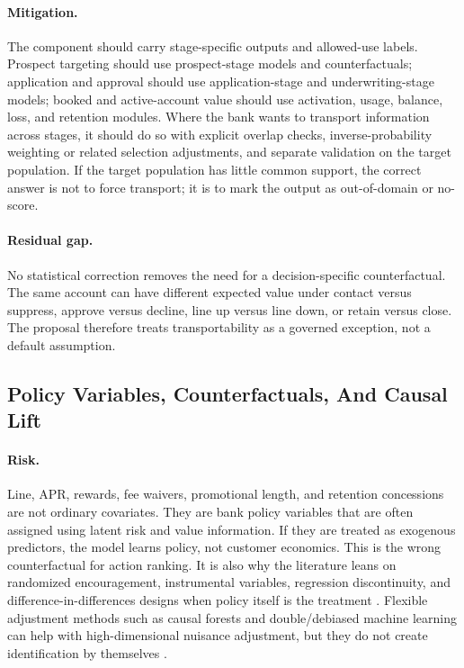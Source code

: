 \documentclass[11pt]{article}
\newcommand{\1}{\mathbf{1}}
\begin{document}
\paragraph{Mitigation.}
The component should carry stage-specific outputs and allowed-use labels.
Prospect targeting should use prospect-stage models and counterfactuals;
application and approval should use application-stage and underwriting-stage
models; booked and active-account value should use activation, usage, balance,
loss, and retention modules. Where the bank wants to transport information
across stages, it should do so with explicit overlap checks, inverse-probability
weighting or related selection adjustments, and separate validation on the
target population. If the target population has little common support, the
correct answer is not to force transport; it is to mark the output as
out-of-domain or no-score.

\paragraph{Residual gap.}
No statistical correction removes the need for a decision-specific
counterfactual. The same account can have different expected value under
contact versus suppress, approve versus decline, line up versus line down, or
retain versus close. The proposal therefore treats transportability as a
governed exception, not a default assumption.

\subsection{Policy Variables, Counterfactuals, And Causal Lift}

\paragraph{Risk.}
Line, APR, rewards, fee waivers, promotional length, and retention concessions
are not ordinary covariates. They are bank policy variables that are often
assigned using latent risk and value information. If they are treated as
exogenous predictors, the model learns policy, not customer economics. This is
the wrong counterfactual for action ranking. It is also why the literature
leans on randomized encouragement, instrumental variables, regression
discontinuity, and difference-in-differences designs when policy itself is
the treatment \citep{angristimbensrubin1996iv,lee2010rd,
callaway2021did,sun2021eventstudy}. Flexible adjustment methods such as
causal forests and double/debiased machine learning can help with
high-dimensional nuisance adjustment, but they do not create identification by
themselves \citep{wager2018causalforests,chernozhukov2018dml}.
\end{document}
